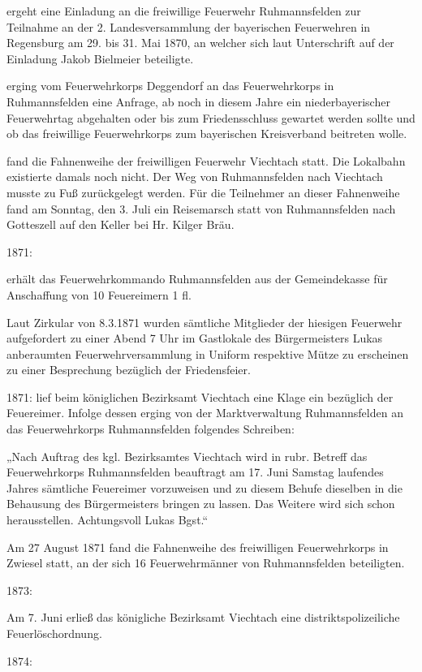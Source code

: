 \documentclass[12pt,a4pager]{book}
\begin{document}
ergeht eine Einladung an die freiwillige Feuerwehr Ruhmannsfelden zur Teilnahme
an der 2. Landesversammlung der bayerischen Feuerwehren in Regensburg am 29. bis
31. Mai 1870, an welcher sich laut Unterschrift auf der Einladung Jakob
Bielmeier beteiligte.

erging vom Feuerwehrkorps Deggendorf an das Feuerwehrkorps in Ruhmannsfelden
eine Anfrage, ab noch in diesem Jahre ein niederbayerischer Feuerwehrtag
abgehalten oder bis zum Friedensschluss gewartet werden sollte und ob das
freiwillige Feuerwehrkorps zum bayerischen Kreisverband beitreten wolle.

fand die Fahnenweihe der freiwilligen Feuerwehr Viechtach statt. Die Lokalbahn
existierte damals noch nicht. Der Weg von Ruhmannsfelden nach Viechtach musste
zu Fuß zurückgelegt werden. Für die Teilnehmer an dieser Fahnenweihe fand am
Sonntag, den 3. Juli ein Reisemarsch statt von Ruhmannsfelden nach Gotteszell
auf den Keller bei Hr. Kilger Bräu.

1871:

erhält das Feuerwehrkommando Ruhmannsfelden aus der Gemeindekasse für
Anschaffung von 10 Feuereimern 1 fl.

    Laut Zirkular von 8.3.1871 wurden sämtliche Mitglieder der hiesigen
    Feuerwehr aufgefordert zu einer Abend 7 Uhr im Gastlokale des Bürgermeisters
    Lukas anberaumten Feuerwehrversammlung in Uniform respektive Mütze zu
    erscheinen zu einer Besprechung bezüglich der Friedensfeier.

1871:   lief beim königlichen Bezirksamt Viechtach eine Klage ein bezüglich der
Feuereimer. Infolge dessen erging von der Marktverwaltung Ruhmannsfelden an das
Feuerwehrkorps Ruhmannsfelden folgendes Schreiben:

„Nach Auftrag des kgl. Bezirksamtes Viechtach wird in rubr. Betreff das
Feuerwehrkorps Ruhmannsfelden beauftragt am 17. Juni Samstag laufendes Jahres
sämtliche Feuereimer vorzuweisen und zu diesem Behufe dieselben in die Behausung
des Bürgermeisters bringen zu lassen. Das Weitere wird sich schon herausstellen.
Achtungsvoll Lukas Bgst.“

Am 27 August 1871 fand die Fahnenweihe des freiwilligen Feuerwehrkorps in
Zwiesel statt, an der sich 16 Feuerwehrmänner von Ruhmannsfelden beteiligten.

1873:

Am 7. Juni erließ das königliche Bezirksamt Viechtach eine distriktspolizeiliche
Feuerlöschordnung.

1874:
\end{document}
